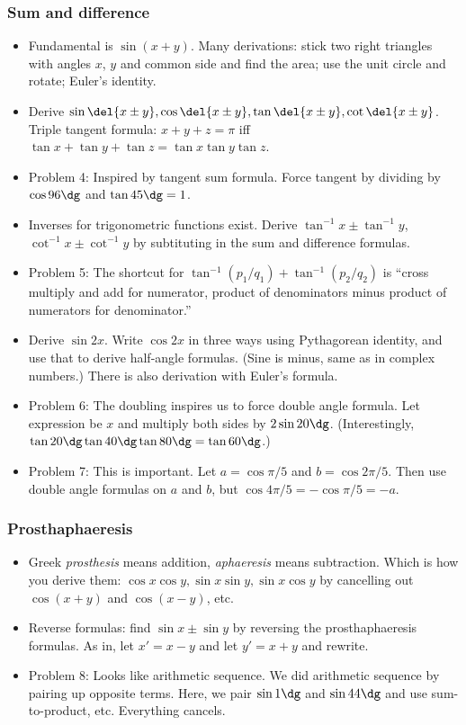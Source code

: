 \documentclass[10pt,paper=letter]{scrartcl}
\begin{document}
\newpage

\subsubsection*{Sum and difference}

\begin{itemize}
  \item Fundamental is $\sin(x + y)$. Many derivations: stick two right triangles with angles $x$, $y$ and common side and find the area; use the unit circle and rotate; Euler's identity.
  \item Derive $\sin\del{x \pm y}, \cos\del{x \pm y}, \tan\del{x \pm y}, \cot\del{x \pm y}$. Triple tangent formula: $x + y + z = \pi$ iff $\tan x + \tan y + \tan z = \tan x \tan y \tan z$.
  \item Problem 4: Inspired by tangent sum formula. Force tangent by dividing by $\cos 96\dg$ and $\tan 45\dg = 1$. 
  \item Inverses for trigonometric functions exist. Derive $\tan^{-1} x \pm \tan^{-1} y$, $\cot^{-1} x \pm \cot^{-1} y$ by subtituting in the sum and difference formulas.
  \item Problem 5: The shortcut for $\tan^{-1}(p_1/q_1) + \tan^{-1}(p_2/q_2)$ is ``cross multiply and add for numerator, product of denominators minus product of numerators for denominator.''
  \item Derive $\sin 2x$. Write $\cos 2x$ in three ways using Pythagorean identity, and use that to derive half-angle formulas. (Sine is minus, same as in complex numbers.) There is also derivation with Euler's formula.
  \item Problem 6: The doubling inspires us to force double angle formula. Let expression be $x$ and multiply both sides by $2\sin 20\dg$. (Interestingly, $\tan20\dg\tan40\dg\tan80\dg = \tan60\dg$.)
  \item Problem 7: This is important. Let $a = \cos{\pi/5}$ and $b = \cos{2\pi/5}$. Then use double angle formulas on $a$ and $b$, but $\cos{4\pi/5} = -\cos{\pi/5} = -a$. 
\end{itemize}

\subsubsection*{Prosthaphaeresis}

\begin{itemize}
  \item Greek \emph{prosthesis} means addition, \emph{aphaeresis} means subtraction. Which is how you derive them: $\cos x \cos y, \sin x\sin y, \sin x \cos y$ by cancelling out $\cos(x + y)$ and $\cos(x - y)$, etc.
  \item Reverse formulas: find $\sin x \pm \sin y$ by reversing the prosthaphaeresis formulas. As in, let $x' = x - y$ and let $y' = x + y$ and rewrite.
  \item Problem 8: Looks like arithmetic sequence. We did arithmetic sequence by pairing up opposite terms. Here, we pair $\sin 1\dg$ and $\sin 44\dg$ and use sum-to-product, etc. Everything cancels.
\end{itemize}
\end{document}
